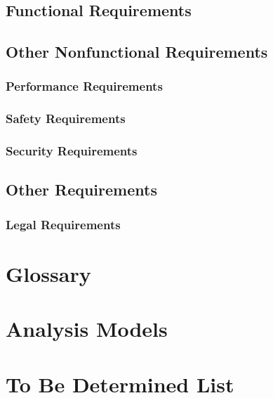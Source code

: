 \section{Functional Requirements}

\section{Other Nonfunctional Requirements}

\subsection{Performance Requirements}
\subsection{Safety Requirements}
\subsection{Security Requirements}

\section{Other Requirements}
\subsection{Legal Requirements}

\begin{appendices}
\chapter{Glossary}
\chapter{Analysis Models}
\chapter{To Be Determined List}


\end{appendices}



